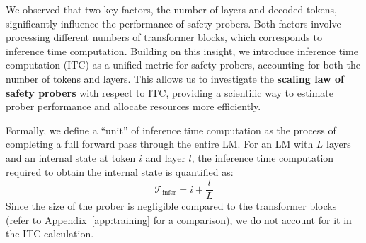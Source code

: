 

We observed that two key factors, the number of layers and decoded tokens, significantly influence the performance of safety probers. Both factors involve processing different numbers of transformer blocks, which corresponds to inference time computation. Building on this insight, we introduce inference time computation (ITC) as a unified metric for safety probers, accounting for both the number of tokens and layers. This allows us to investigate the \textbf{scaling law of safety probers} with respect to ITC, providing a scientific way to estimate prober performance and allocate resources more efficiently.



Formally, we define a ``unit'' of inference time computation as the process of completing a full forward pass through the entire LM. For an LM with $L$ layers and an internal state at token $i$ and layer $l$, the inference time computation required to obtain the internal state is quantified as:
\begin{equation}
\mathcal{T}_{\text{infer}}=i+\frac{l}{L}
\end{equation}
Since the size of the prober is negligible compared to the transformer blocks (refer to Appendix~\ref{app:training} for a comparison), we do not account for it in the ITC calculation.


